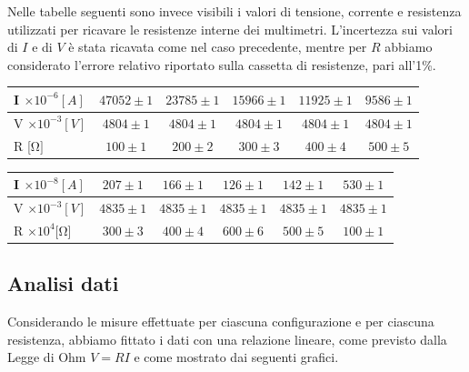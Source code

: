 \documentclass[a4paper]{article}
\begin{document}
Nelle tabelle seguenti sono invece visibili i valori di tensione, corrente e resistenza utilizzati per ricavare le resistenze interne dei multimetri.
L'incertezza sui valori di \(I\) e di \(V\) è stata ricavata come nel caso precedente, mentre per \(R\) abbiamo considerato l'errore relativo
riportato sulla cassetta di resistenze, pari all'1\%.

\begin{center}
\begin{tabular}{|l|c c c c c|}
\hline
I $\times 10^{-6}[A]$ & $47052 \pm 1$ & $23785 \pm 1$ & $15966 \pm 1$ & $11925 \pm 1$ & $9586 \pm 1$ \\
\hline
V $\times 10^{-3}[V]$ & $4804 \pm 1$ & $4804 \pm 1$ & $4804 \pm 1$ & $4804 \pm 1$ & $4804 \pm 1$ \\
\hline
R [$\si{\ohm}]$ & $100 \pm 1$ & $200 \pm 2$ & $300 \pm 3$ & $400 \pm 4$ & $500 \pm 5$ \\
\hline
\end{tabular}
\vspace{10mm}
\begin{tabular}{|l|c c c c c|}
\hline
I $\times 10^{-8}[A]$ & $207 \pm 1$ & $166 \pm 1$ & $126 \pm 1$ & $142 \pm 1$ & $530 \pm 1$ \\
\hline
V $\times 10^{-3}[V]$ & $4835 \pm 1$ & $4835 \pm 1$ & $4835 \pm 1$ & $4835 \pm 1$ & $4835 \pm 1$ \\
\hline
R $\times 10^{4}[$\si{\ohm}] & $300 \pm 3$ & $400 \pm 4$ & $600 \pm 6$ & $500 \pm 5$ & $100 \pm 1$ \\
\hline
\end{tabular}
\end{center}

\subsection{Analisi dati}
Considerando le misure effettuate per ciascuna configurazione e per ciascuna resistenza, abbiamo fittato i dati con una relazione lineare, come previsto dalla Legge di Ohm \( V = RI \) e come mostrato dai seguenti grafici.
\end{document}
